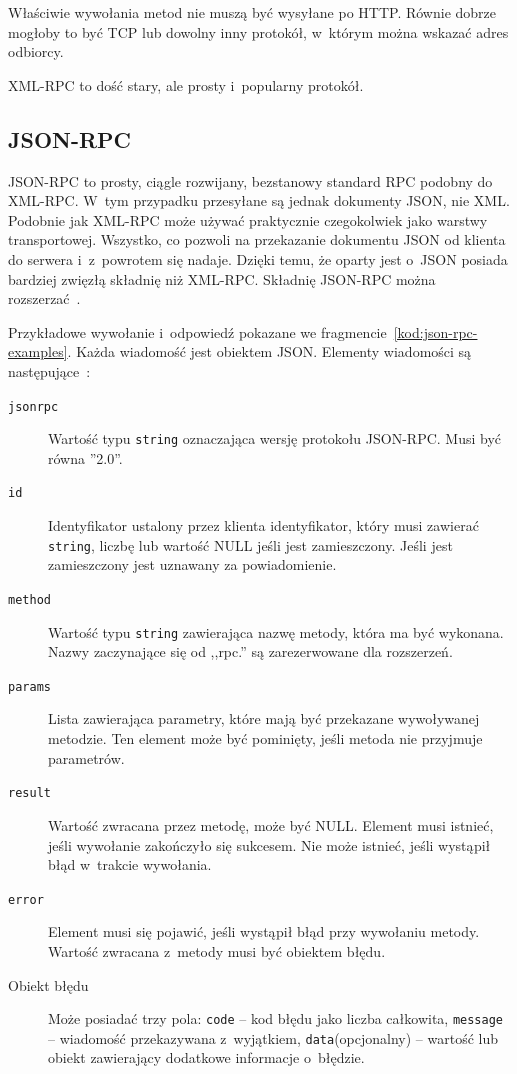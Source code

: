 Właściwie wywołania metod nie muszą być wysyłane po HTTP. Równie dobrze mogłoby to być TCP lub dowolny inny protokół, w~którym można wskazać adres odbiorcy.

XML-RPC to dość stary, ale prosty i~popularny protokół.



\subsection{JSON-RPC}
\label{json-rpc}
JSON-RPC to prosty, ciągle rozwijany, bezstanowy standard RPC podobny do XML-RPC. W~tym przypadku przesyłane są jednak dokumenty JSON, nie XML.
Podobnie jak XML-RPC może używać praktycznie czegokolwiek jako warstwy transportowej.
Wszystko, co pozwoli na przekazanie dokumentu JSON od klienta do serwera i~z~powrotem się nadaje.
Dzięki temu, że oparty jest o~JSON posiada bardziej zwięzłą składnię niż XML-RPC.
Składnię JSON-RPC można rozszerzać~\cite{json-rpc-extensions}.

Przykładowe wywołanie i~odpowiedź pokazane we fragmencie~\ref{kod:json-rpc-examples}.
Każda wiadomość jest obiektem JSON.
Elementy wiadomości są następujące~\cite{json-rpc-specification}:
\begin{description}
	\item[\texttt{jsonrpc}] Wartość typu \texttt{string} oznaczająca wersję protokołu JSON-RPC. Musi być równa ''2.0''.
	\item[\texttt{id}] Identyfikator ustalony przez klienta identyfikator, który musi zawierać \texttt{string}, liczbę lub wartość NULL jeśli jest zamieszczony. Jeśli jest zamieszczony jest uznawany za powiadomienie.
	\item[\texttt{method}] Wartość typu \texttt{string} zawierająca nazwę metody, która ma być wykonana. Nazwy zaczynające się od ,,rpc.'' są zarezerwowane dla rozszerzeń.
	\item[\texttt{params}] Lista zawierająca parametry, które mają być przekazane wywoływanej metodzie. Ten element może być pominięty, jeśli metoda nie przyjmuje parametrów.
	\item[\texttt{result}] Wartość zwracana przez metodę, może być NULL. Element musi istnieć, jeśli wywołanie zakończyło się sukcesem. Nie może istnieć, jeśli wystąpił błąd w~trakcie wywołania.
	\item[\texttt{error}] Element musi się pojawić, jeśli wystąpił błąd przy wywołaniu metody. Wartość zwracana z~metody musi być obiektem błędu.
	\item[Obiekt błędu] Może posiadać trzy pola: \texttt{code} -- kod błędu jako liczba całkowita, \texttt{message} -- wiadomość przekazywana z~wyjątkiem, \texttt{data}(opcjonalny) -- wartość lub obiekt zawierający dodatkowe informacje o~błędzie.
\end{description}

